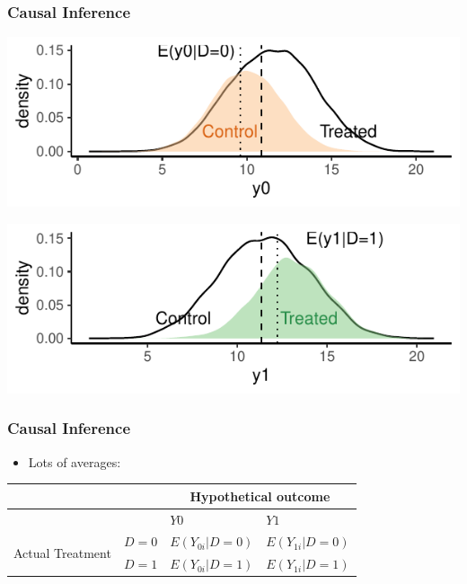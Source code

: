 \documentclass[xcolor=x11names,compress]{beamer}\usepackage[]{graphicx}\usepackage[]{color}
\makeatletter
\def\maxwidth{ %
  \ifdim\Gin@nat@width>\linewidth
    \linewidth
  \else
    \Gin@nat@width
  \fi
}
\newenvironment{knitrout}{}{} %
\renewcommand{\(}{\begin{columns}}
\renewcommand{\)}{\end{columns}}
\newcommand{\<}[1]{\begin{column}{#1}}
\renewcommand{\>}{\end{column}}
\makeatother
\begin{document}
\begin{frame}
\frametitle{Causal Inference}
\begin{knitrout}
\color{fgcolor}
\includegraphics[width=\maxwidth]{figure/OVB1d-1} 

\end{knitrout}

\begin{knitrout}
\color{fgcolor}
\includegraphics[width=\maxwidth]{figure/OVB2d-1} 

\end{knitrout}
\end{frame}

\begin{frame}
\frametitle{Causal Inference}
\begin{itemize}
\item Lots of averages:
\end{itemize}
\begin{table}[htbp]
  \centering
    \begin{tabular}{|c|l|l|l|}
    \hline
          &       & \multicolumn{2}{c|}{Hypothetical outcome} \bigstrut\\
    \hline
          &       & $Y0$    & $Y1$ \bigstrut\\
    \hline
    \multirow{2}[4]{*}{Actual Treatment} & $D=0$   & $E(Y_{0i}|D=0)$ & $E(Y_{1i}|D=0)$ \bigstrut\\
\cline{2-4}          & $D=1$   & $E(Y_{0i}|D=1)$ & $E(Y_{1i}|D=1)$ \bigstrut\\
    \hline
    \end{tabular}%
  \label{tab:addlabel}%
\end{table}%
\end{frame}
\end{document}
